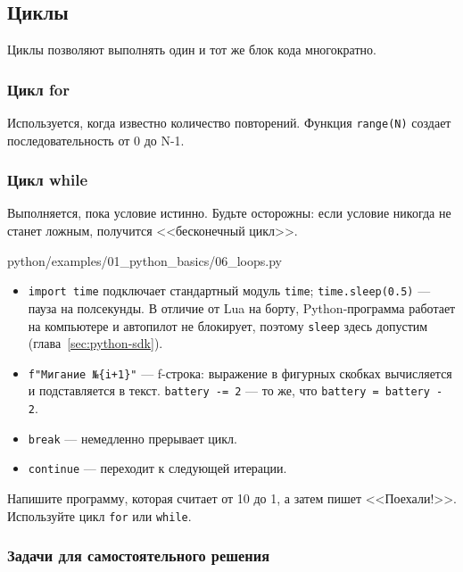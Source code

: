 \subsection{Циклы}

Циклы позволяют выполнять один и тот же блок кода многократно.

\subsubsection*{Цикл for}
Используется, когда известно количество повторений. Функция \texttt{range(N)} создает последовательность от 0 до N-1.

\subsubsection*{Цикл while}
Выполняется, пока условие истинно. Будьте осторожны: если условие никогда не станет ложным, получится <<бесконечный цикл>>.

\begin{codefile}[python]{python/examples/01_python_basics/06_loops.py}
\end{codefile}

\begin{itemize}
    \item \texttt{import time} подключает стандартный модуль \texttt{time}; \texttt{time.sleep(0.5)} --- пауза на полсекунды. В отличие от Lua на борту, Python-программа работает на компьютере и автопилот не блокирует, поэтому \texttt{sleep} здесь допустим (глава~\ref{sec:python-sdk}).
    \item \texttt{f"Мигание №\{i+1\}"} --- f-строка: выражение в фигурных скобках вычисляется и подставляется в текст. \texttt{battery -= 2} --- то же, что \texttt{battery = battery - 2}.
    \item \texttt{break} — немедленно прерывает цикл.
    \item \texttt{continue} — переходит к следующей итерации.
\end{itemize}

\begin{taskbox}
Напишите программу, которая считает от 10 до 1, а затем пишет <<Поехали!>>. Используйте цикл \texttt{for} или \texttt{while}.
\end{taskbox}

\subsubsection*{Задачи для самостоятельного решения}


